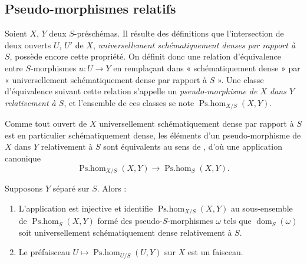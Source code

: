 \subsection{Pseudo-morphismes relatifs}
\label{IV.20.5}

\begin{env}[20.5.1]
\label{IV.20.5.1}
Soient $X$, $Y$ deux $S$-préschémas.
Il résulte des définitions  que l'intersection de deux ouverts $U$, $U'$ de $X$, \emph{universellement schématiquement denses par rapport à $S$}, possède encore cette propriété.
On définit donc une relation d'équivalence entre $S$-morphismes $u:U\to Y$ en remplaçant dans  « schématiquement dense » par « universellement schématiquement dense par rapport à $S$ ».
Une classe d'équivalence suivant cette relation s'appelle un \emph{pseudo-morphisme de $X$ dans $Y$ relativement à $S$}, et l'ensemble de ces classes se note $\operatorname{Ps.hom}_{X/S}(X,Y)$.
\end{env}

\begin{env}[20.5.2]
\label{IV.20.5.2}
Comme tout ouvert de $X$ universellement schématiquement dense par rapport à $S$ est en particulier schématiquement dense, les éléments d'un pseudo-morphisme
de $X$ dans $Y$ relativement à $S$ sont équivalents au sens de , d'où une application canonique
\[
\label{IV.20.5.2.1}
  \operatorname{Ps.hom}_{X/S}(X,Y)\to\operatorname{Ps.hom}_S(X,Y).
  \tag{20.5.2.1}
\]
\end{env}

\begin{proposition}[20.5.3]
\label{IV.20.5.3}
Supposons $Y$ séparé sur $S$.
Alors :
\begin{enumerate}[label=\emph{(\roman*)}]
  \item L'application  est injective et identifie $\operatorname{Ps.hom}_{X/S}(X,Y)$ au sous-ensemble de $\operatorname{Ps.hom}_S(X,Y)$ formé des pseudo-$S$-morphismes $\omega$ tels que $\operatorname{dom}_S(\omega)$ soit universellement schématiquement dense relativement à $S$.
  \item Le préfaisceau $U\mapsto\operatorname{Ps.hom}_{U/S}(U,Y)$ sur $X$ est un faisceau.
\end{enumerate}
\end{proposition}

